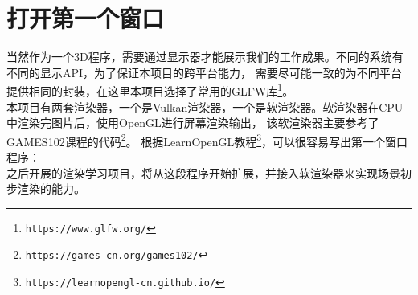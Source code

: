 \section{打开第一个窗口}
当然作为一个3D程序，需要通过显示器才能展示我们的工作成果。不同的系统有不同的显示API，为了保证本项目的跨平台能力，
需要尽可能一致的为不同平台提供相同的封装，在这里本项目选择了常用的GLFW库\footnote{\nolinkurl{https://www.glfw.org/}}。\\

本项目有两套渲染器，一个是Vulkan渲染器，一个是软渲染器。软渲染器在CPU中渲染完图片后，使用OpenGL进行屏幕渲染输出，
该软渲染器主要参考了GAMES102课程的代码\footnote{\nolinkurl{https://games-cn.org/games102/}}。
根据LearnOpenGL教程\footnote{\nolinkurl{https://learnopengl-cn.github.io/}}，可以很容易写出第一个窗口程序：\\



之后开展的渲染学习项目，将从这段程序开始扩展，并接入软渲染器来实现场景初步渲染的能力。
